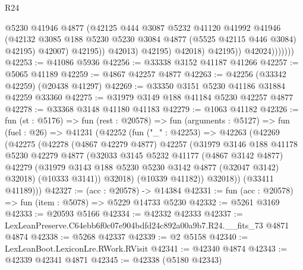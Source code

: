 \begin{lexlean}{R24}
\begin{coremodule}
                                @5230
                                @41946
                                @4877
                                (@42125
                                  @444
                                  @3087
                                  @5232
                                  @41120
                                  @41992
                                  @41946
                                  (@42132
                                    @3085
                                    @188
                                    @5230
                                    @5230
                                    @3084
                                    @4877
                                    (@5525 @42115 @446 @3084)
                                    @42195)
                                  @42007)
                                @42195))
                            @42013)
                          @42195)
                        @42018)
                      @42195))
                  @42024)))))))
@42253 := @41086 @5936
@42256 := @33338 @3152 @41187 @41266
@42257 := @5065 @41189
@42259 := @4867 @42257 @4877
@42263 := @42256 (@33342 @42259) (@20438 @41297)
@42269 := @33350 @3151 @5230 @41186 @31884 @42259 @33360
@42275 := @31979 @3149 @188 @41184 @5230 @42257 @4877
@42278 := @33368 @3148 @41180 @41183
@42279 := @1063 @41182
@42326 := fun (st : @5176) =>
  fun (rest : @20578) =>
  fun (arguments : @5127) =>
  fun (fuel : @26) =>
  @41231
    (@42252
      (fun ("_" : @42253) =>
      @42263
        (@42269
          (@42275
            (@42278
              (@4867 @42279 @4877)
              @42257
              (@31979
                @3146
                @188
                @41178
                @5230
                @42279
                @4877
                (@32033
                  @3145
                  @5232
                  @41177
                  (@4867 @3142 @4877)
                  @42279
                  (@31979 @3143 @188 @5230 @5230 @3142 @4877 (@32047 @3142) @32018)
                  (@10333 @3141))
                @32018)
              (@10339 @41182))
            @32018))
        (@33411 @41189)))
@42327 := (acc : @20578) -> @14384
@42331 := fun (acc : @20578) => fun (item : @5078) => @5229 @14733 @5230
@42332 := @5261 @3169
@42333 := @20593 @5166
@42334 := @42332 @42333
@42337 := LexLeanPreserve.C64ebb6f0c07e904bdfd24c892a00a9b7.R24.__fits_73 @4871 @4874
@42338 := @5268 @42337
@42339 := @2 @5158
@42340 := LexLeanBoot.LexiconLre.RWork.RVisit
@42341 := @42340 @4874
@42343 := @42339 @42341 @4871
@42345 := @42338 (@5180 @42343)

\end{coremodule}
\end{lexlean}
